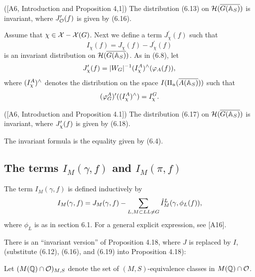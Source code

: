 \begin{proposition}
([A6, Introduction and Proposition 4,1]) The distribution
(6.13) on ${\cal{H}}(\overline{G({\Bbb{A}}_S)})$ is invariant,
where $J_{\cal{O}}^{\prime }(f)$ is given
by (6.16).
\end{proposition}

Assume that ${\chi }\in {\cal{X}}-{\cal{X}}(G)$.
Next we define a term $J_{{ \chi }}^{\prime }(f)$ such that 
\begin{equation}
I_{{\chi }}(f)=J_{{\chi }}(f)-J_{{\chi }}^{\prime }(f)
\end{equation}
is an invariant distribution on
${\cal{H}}(\overline{G({\Bbb{A}}_S)})$.
As in (6.8), let 
\begin{equation}
J_{{\chi }}^{\prime }(f)=|W_G|^{-1}(I_{{\cal \chi }}^A)^{\wedge
}(\varphi _A(f)),
\end{equation}
where $(I_{{\cal \chi }}^A)^{\wedge }$ denotes the distribution on the
space $I(\Pi _u(\overline{A({\Bbb {A}}_S)}))$ such that 
\[
(\varphi _G^A)^{\prime }((I_{{\cal \chi }}^A)^{\wedge })=I_{{\cal \chi }}^G. 
\]

\begin{proposition}
([A6, Introduction and Proposition 4.1]) The distribution (6.17)
on ${\cal{H}}(\overline{G({\Bbb{A}}_S)})$ is invariant,
where $J_{{\cal \chi }}^{\prime }(f)$ is
given by (6.18).
\end{proposition}

The invariant formula is the equality given by (6.4).

\subsection{The terms $I_M(\gamma, f)$ and $I_M(\pi,f)$}

The term $I_M(\gamma,f)$ is defined inductively by
\begin{equation}
I_M(\gamma,f)
=J_M(\gamma,f)-
\sum_{ L, M\subset L\\ L\not= G}
\hat{I}_M^L(\gamma,\phi_L(f)),
\end{equation}
where $\phi_L$ is as in section 6.1.
For a general explicit expression, see [A16].

There is an ``invariant version'' of Proposition 4.18, where $J$ is
replaced by $I$, (substitute (6.12),
(6.16), and (6.19) into Proposition 4.18):

Let $(M({\Bbb{Q}})\cap {\cal{O}})_{M,S}$ denote the set of
$(M,S)$-equivalence classes in $M({\Bbb {Q}})\cap {\cal{O}}$.

